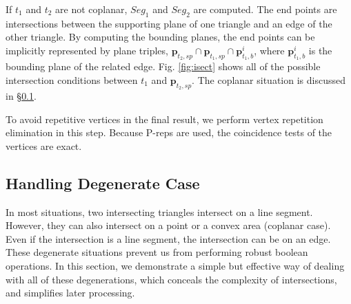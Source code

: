 If $t_1$ and $t_2$ are not coplanar, $Seg_1$ and $Seg_2$ are computed. The end points are intersections between the supporting plane of one triangle and an edge of the other triangle. By computing the bounding planes, the end points can be implicitly represented by plane triples, $\bm{p}_{t_2, sp} \cap \bm{p}_{t_1, sp} \cap \bm{p}^i_{t_1, b}$, where $\bm{p}^i_{t_1, b}$ is the bounding plane of the related edge.
Fig. \ref{fig:isect} shows all of the possible intersection conditions between $t_1$ and $\bm{p}_{t_2, sp}$. The coplanar situation is discussed in \S \ref{sec:degenerate}.

To avoid repetitive vertices in the final result, we perform vertex repetition elimination in this step. Because P-reps are used, the coincidence tests of the vertices are exact.



\subsection{Handling Degenerate Case }
\label{sec:degenerate}


In most situations, two intersecting triangles intersect on a line segment. However, they can also intersect on a point or a convex area (coplanar case). Even if the intersection is a line segment, the intersection can be on an edge. These degenerate situations prevent us from performing robust boolean operations. In this section, we demonstrate a simple but effective way of dealing with all of these degenerations, which conceals the complexity of intersections, and simplifies later processing.



